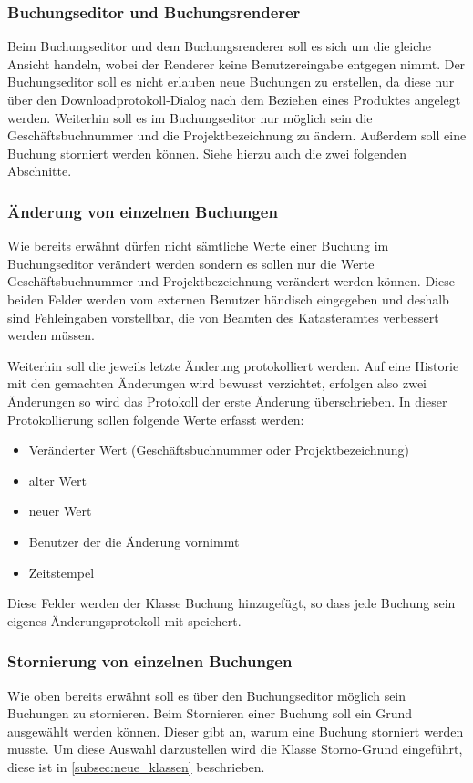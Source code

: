 \subsubsection{Buchungseditor und Buchungsrenderer}
Beim Buchungseditor und dem Buchungsrenderer soll es sich um die gleiche Ansicht handeln, wobei der Renderer keine Benutzereingabe entgegen nimmt.
Der Buchungseditor soll es nicht erlauben neue Buchungen zu erstellen, da diese nur über den Downloadprotokoll-Dialog nach dem Beziehen eines Produktes angelegt werden.
Weiterhin soll es im Buchungseditor nur möglich sein die Geschäftsbuchnummer und die Projektbezeichnung zu ändern.
Außerdem soll eine Buchung storniert werden können.
Siehe hierzu auch die zwei folgenden Abschnitte.

\subsubsection{Änderung von einzelnen Buchungen} \label{subsubsec:aendern_buchung}
Wie bereits erwähnt dürfen nicht sämtliche Werte einer Buchung im Buchungseditor verändert werden sondern es sollen nur die Werte Geschäftsbuchnummer und Projektbezeichnung verändert werden können.
Diese beiden Felder werden vom externen Benutzer händisch eingegeben und deshalb sind Fehleingaben vorstellbar, die von Beamten des Katasteramtes verbessert werden müssen.

Weiterhin soll die jeweils letzte Änderung protokolliert werden. Auf eine Historie mit den gemachten Änderungen wird bewusst verzichtet, erfolgen also zwei Änderungen so wird das Protokoll der erste Änderung überschrieben. In dieser Protokollierung sollen folgende Werte erfasst werden:
\begin{itemize}
\item Veränderter Wert (Geschäftsbuchnummer oder Projektbezeichnung)
\item alter Wert
\item neuer Wert
\item Benutzer der die Änderung vornimmt
\item Zeitstempel
\end{itemize}
Diese Felder werden der Klasse Buchung hinzugefügt, so dass jede Buchung sein eigenes Änderungsprotokoll mit speichert.

\subsubsection{Stornierung von einzelnen Buchungen} \label{subsubsec:storno_buchung}
Wie oben bereits erwähnt soll es über den Buchungseditor möglich sein Buchungen zu stornieren. Beim Stornieren einer Buchung soll ein Grund ausgewählt werden können. Dieser gibt an, warum eine Buchung storniert werden musste. Um diese Auswahl darzustellen wird die Klasse Storno-Grund eingeführt, diese ist in \ref{subsec:neue_klassen} beschrieben.

